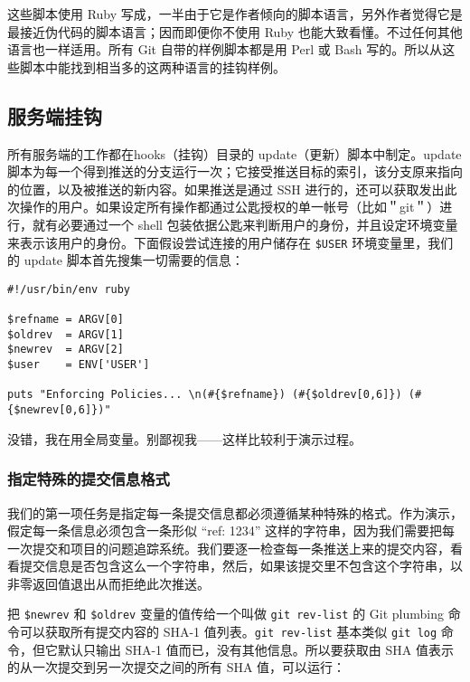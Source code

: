 \documentclass[a4paper]{book}
\begin{document}
这些脚本使用 Ruby 写成，一半由于它是作者倾向的脚本语言，另外作者觉得它是最接近伪代码的脚本语言；因而即便你不使用 Ruby 也能大致看懂。不过任何其他语言也一样适用。所有 Git 自带的样例脚本都是用 Perl 或 Bash 写的。所以从这些脚本中能找到相当多的这两种语言的挂钩样例。

\subsection{服务端挂钩}

所有服务端的工作都在hooks（挂钩）目录的 update（更新）脚本中制定。update 脚本为每一个得到推送的分支运行一次；它接受推送目标的索引，该分支原来指向的位置，以及被推送的新内容。如果推送是通过 SSH 进行的，还可以获取发出此次操作的用户。如果设定所有操作都通过公匙授权的单一帐号（比如＂git＂）进行，就有必要通过一个 shell 包装依据公匙来判断用户的身份，并且设定环境变量来表示该用户的身份。下面假设尝试连接的用户储存在 \texttt{\$USER} 环境变量里，我们的 update 脚本首先搜集一切需要的信息：

\begin{shaded}\begin{verbatim}
#!/usr/bin/env ruby

$refname = ARGV[0]
$oldrev  = ARGV[1]
$newrev  = ARGV[2]
$user    = ENV['USER']

puts "Enforcing Policies... \n(#{$refname}) (#{$oldrev[0,6]}) (#{$newrev[0,6]})"
\end{verbatim}\end{shaded}

没错，我在用全局变量。别鄙视我------这样比较利于演示过程。

\subsubsection{指定特殊的提交信息格式}

我们的第一项任务是指定每一条提交信息都必须遵循某种特殊的格式。作为演示，假定每一条信息必须包含一条形似 “ref: 1234” 这样的字符串，因为我们需要把每一次提交和项目的问题追踪系统。我们要逐一检查每一条推送上来的提交内容，看看提交信息是否包含这么一个字符串，然后，如果该提交里不包含这个字符串，以非零返回值退出从而拒绝此次推送。

把 \texttt{\$newrev} 和 \texttt{\$oldrev} 变量的值传给一个叫做 \texttt{git rev-list} 的 Git plumbing 命令可以获取所有提交内容的 SHA-1 值列表。\texttt{git rev-list} 基本类似 \texttt{git log} 命令，但它默认只输出 SHA-1 值而已，没有其他信息。所以要获取由 SHA 值表示的从一次提交到另一次提交之间的所有 SHA 值，可以运行：
\end{document}
